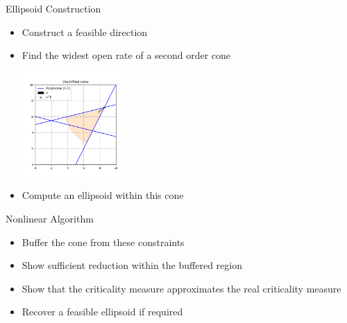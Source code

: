 \documentclass{beamer}
\begin{document}
\begin{frame}{Ellipsoid Construction}
	\begin{itemize}
		\item Construct a feasible direction
		\item Find the widest open rate of a second order cone
\begin{center}
	\includegraphics[width=150px]{images/unshifted_cone.png}
\end{center}
		\item Compute an ellipsoid within this cone
	\end{itemize}
\end{frame}

% 	

% 


\begin{frame}{Nonlinear Algorithm}
	\begin{itemize}
		\item Buffer the cone from these constraints
		\item Show sufficient reduction within the buffered region
		\item Show that the criticality measure approximates the real criticality measure
		\item Recover a feasible ellipsoid if required
	\end{itemize}
\end{frame}
\end{document}
